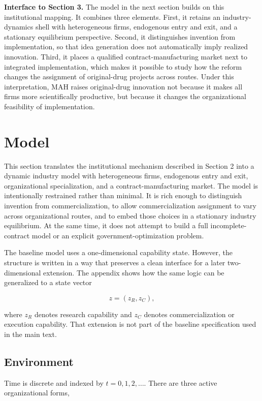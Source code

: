 \documentclass[12pt]{article}
\begin{document}
\textbf{Interface to Section 3.} The model in the next section builds on this institutional mapping. It combines three elements. First, it retains an industry-dynamics shell with heterogeneous firms, endogenous entry and exit, and a stationary equilibrium perspective. Second, it distinguishes invention from implementation, so that idea generation does not automatically imply realized innovation. Third, it places a qualified contract-manufacturing market next to integrated implementation, which makes it possible to study how the reform changes the assignment of original-drug projects across routes. Under this interpretation, MAH raises original-drug innovation not because it makes all firms more scientifically productive, but because it changes the organizational feasibility of implementation.

\section{Model}

This section translates the institutional mechanism described in Section 2 into a dynamic industry model with heterogeneous firms, endogenous entry and exit, organizational specialization, and a contract-manufacturing market. The model is intentionally restrained rather than minimal. It is rich enough to distinguish invention from commercialization, to allow commercialization assignment to vary across organizational routes, and to embed those choices in a stationary industry equilibrium. At the same time, it does not attempt to build a full incomplete-contract model or an explicit government-optimization problem.

The baseline model uses a one-dimensional capability state. However, the structure is written in a way that preserves a clean interface for a later two-dimensional extension. The appendix shows how the same logic can be generalized to a state vector

\[
z=(z_R,z_C),
\]

where $z_R$ denotes research capability and $z_C$ denotes commercialization or execution capability. That extension is not part of the baseline specification used in the main text.

\subsection{Environment}

Time is discrete and indexed by $t=0,1,2,\ldots$. There are three active organizational forms,
\end{document}
